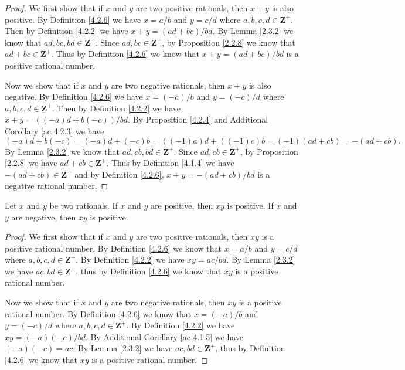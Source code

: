 \begin{proof}
    We first show that if \(x\) and \(y\) are two positive rationals, then \(x + y\) is also positive.
    By Definition \ref{4.2.6} we have \(x = a / b\) and \(y = c / d\) where \(a, b, c, d \in \mathbf{Z}^+\).
    Then by Definition \ref{4.2.2} we have \(x + y = (ad + bc) / bd\).
    By Lemma \ref{2.3.2} we know that \(ad, bc, bd \in \mathbf{Z}^+\).
    Since \(ad, bc \in \mathbf{Z}^+\), by Proposition \ref{2.2.8} we know that \(ad + bc \in \mathbf{Z}^+\).
    Thus by Definition \ref{4.2.6} we know that \(x + y = (ad + bc) / bd\) is a positive rational number.

    Now we show that if \(x\) and \(y\) are two negative rationals, then \(x + y\) is also negative.
    By Definition \ref{4.2.6} we have \(x = (-a) / b\) and \(y = (-c) / d\) where \(a, b, c, d \in \mathbf{Z}^+\).
    Then by Definition \ref{4.2.2} we have \(x + y = ((-a)d + b(-c)) / bd\).
    By Proposition \ref{4.2.4} and Additional Corollary \ref{ac 4.2.3} we have
    \[
        (-a)d + b(-c) = (-a)d + (-c)b = ((-1)a)d + ((-1)c)b = (-1)(ad + cb) = -(ad + cb).
    \]
    By Lemma \ref{2.3.2} we know that \(ad, cb, bd \in \mathbf{Z}^+\).
    Since \(ad, cb \in \mathbf{Z}^+\), by Proposition \ref{2.2.8} we have \(ad + cb \in \mathbf{Z}^+\).
    Thus by Definition \ref{4.1.4} we have \(-(ad + cb) \in \mathbf{Z}^-\) and by Definition \ref{4.2.6}, \(x + y = -(ad + cb) / bd\) is a negative rational number.
\end{proof}

\begin{additional corollary}\label{ac 4.2.5}
Let \(x\) and \(y\) be two rationals.
If \(x\) and \(y\) are positive, then \(xy\) is positive.
If \(x\) and \(y\) are negative, then \(xy\) is positive.
\end{additional corollary}

\begin{proof}
    We first show that if \(x\) and \(y\) are two positive rationals, then \(xy\) is a positive rational number.
    By Definition \ref{4.2.6} we know that \(x = a / b\) and \(y = c / d\) where \(a, b, c, d \in \mathbf{Z}^+\).
    By Definition \ref{4.2.2} we have \(xy = ac / bd\).
    By Lemma \ref{2.3.2} we have \(ac, bd \in \mathbf{Z}^+\), thus by Definition \ref{4.2.6} we know that \(xy\) is a positive rational number.

    Now we show that if \(x\) and \(y\) are two negative rationals, then \(xy\) is a positive rational number.
    By Definition \ref{4.2.6} we know that \(x = (-a) / b\) and \(y = (-c) / d\) where \(a, b, c, d \in \mathbf{Z}^+\).
    By Definition \ref{4.2.2} we have \(xy = (-a)(-c) / bd\).
    By Additional Corollary \ref{ac 4.1.5} we have \((-a)(-c) = ac\).
    By Lemma \ref{2.3.2} we have \(ac, bd \in \mathbf{Z}^+\), thus by Definition \ref{4.2.6} we know that \(xy\) is a positive rational number.
\end{proof}

